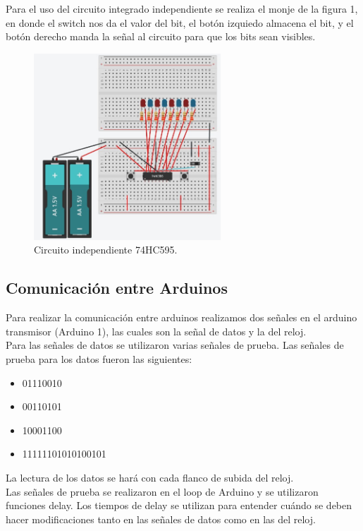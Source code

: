 \documentclass{article}
\begin{document}
Para el uso del circuito integrado independiente se realiza el monje de la figura 1, en donde el switch nos da el valor del bit, el botón izquiedo almacena el bit, y el botón derecho manda la señal al circuito para que los bits sean visibles.

\begin{figure}[h]
\includegraphics[width=7cm]{74HC595.jpg}
\centering
\caption{Circuito independiente 74HC595.}
\label{fig:74HC595.jpg}
\end{figure}



\subsection{Comunicación entre Arduinos}
Para realizar la comunicación entre arduinos realizamos dos señales en el arduino transmisor (Arduino 1), las cuales son la señal de datos y la del reloj. \\

Para las señales de datos se utilizaron varias señales de prueba. Las señales de prueba para los datos fueron las siguientes:
\begin{itemize}
\item 01110010
\item 00110101
\item 10001100
\item 11111101010100101
\end{itemize}

La lectura de los datos se hará con cada flanco de subida del reloj.\\

Las señales de prueba se realizaron en el loop de Arduino y se utilizaron funciones delay. Los tiempos de delay se utilizan para entender cuándo se deben hacer modificaciones tanto en las señales de datos como en las del reloj.\\
\end{document}
